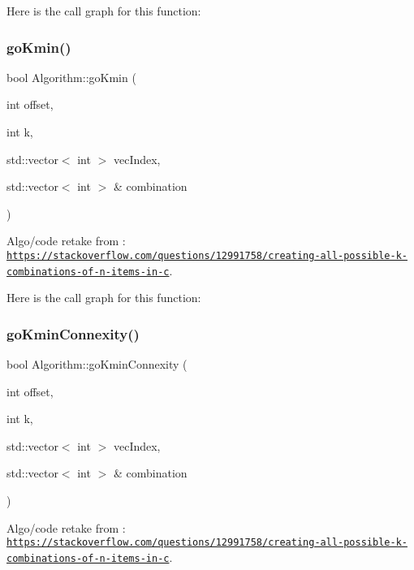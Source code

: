 Here is the call graph for this function\+:
\mbox{\label{struct_algorithm_a6596dc464bb675414435c341a76cd2b6}} 
\subsubsection{\texorpdfstring{go\+Kmin()}{goKmin()}}
{\footnotesize\ttfamily bool Algorithm\+::go\+Kmin (\begin{DoxyParamCaption}\item[{int}]{offset,  }\item[{int}]{k,  }\item[{std\+::vector$<$ int $>$}]{vec\+Index,  }\item[{std\+::vector$<$ int $>$ \&}]{combination }\end{DoxyParamCaption})}



Algo/code retake from \+: \href{https://stackoverflow.com/questions/12991758/creating-all-possible-k-combinations-of-n-items-in-c}{\tt https\+://stackoverflow.\+com/questions/12991758/creating-\/all-\/possible-\/k-\/combinations-\/of-\/n-\/items-\/in-\/c}. 

Here is the call graph for this function\+:
\mbox{\label{struct_algorithm_a58bead487e29355d8d69ea68f598d6f1}} 
\subsubsection{\texorpdfstring{go\+Kmin\+Connexity()}{goKminConnexity()}}
{\footnotesize\ttfamily bool Algorithm\+::go\+Kmin\+Connexity (\begin{DoxyParamCaption}\item[{int}]{offset,  }\item[{int}]{k,  }\item[{std\+::vector$<$ int $>$}]{vec\+Index,  }\item[{std\+::vector$<$ int $>$ \&}]{combination }\end{DoxyParamCaption})}



Algo/code retake from \+: \href{https://stackoverflow.com/questions/12991758/creating-all-possible-k-combinations-of-n-items-in-c}{\tt https\+://stackoverflow.\+com/questions/12991758/creating-\/all-\/possible-\/k-\/combinations-\/of-\/n-\/items-\/in-\/c}. 

